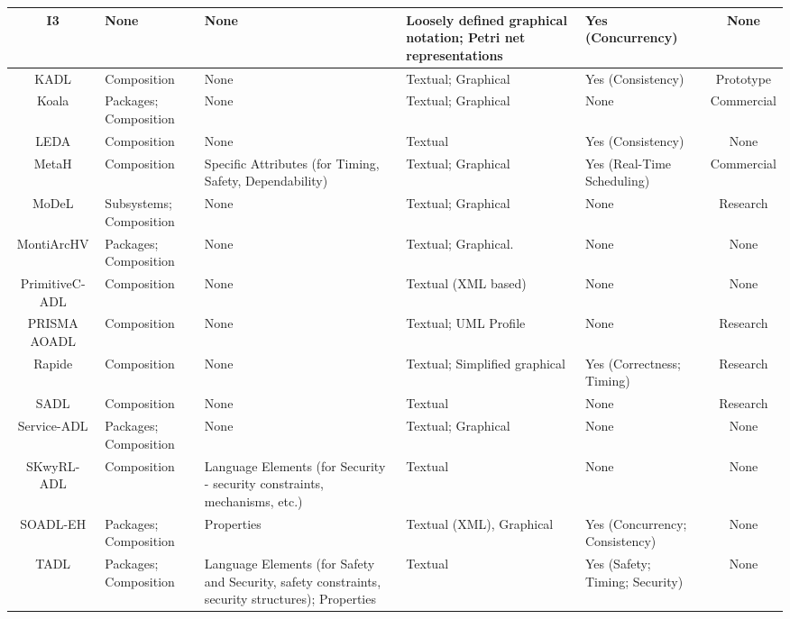 \begin{landscape}
\begin{longtable}{|c|P{2cm}|P{3cm}|P{3cm}|p{2cm}|c|}
I3 & None & None & Loosely defined graphical notation; Petri net representations & Yes (Concurrency) & None \\ 
\hline

KADL & Composition & None & Textual; Graphical & Yes (Consistency) & Prototype \\ 
\hline

Koala & Packages; Composition & None & Textual; Graphical & None & Commercial \\ 
\hline

LEDA & Composition & None & Textual & Yes (Consistency) & None \\ 
\hline

MetaH & Composition & Specific Attributes (for Timing, Safety, Dependability) & Textual; Graphical & Yes (Real-Time Scheduling) & Commercial \\ 
\hline

MoDeL & Subsystems; Composition & None & Textual; Graphical & None & Research \\ 
\hline

MontiArcHV & Packages; Composition & None & Textual; Graphical. & None & None \\ 
\hline

PrimitiveC-ADL & Composition & None & Textual (XML based) & None & None \\ 
\hline

PRISMA AOADL & Composition & None & Textual; UML Profile & None & Research \\ 
\hline

Rapide & Composition & None & Textual; Simplified graphical & Yes (Correctness; Timing) & Research \\ 
\hline

SADL & Composition & None & Textual & None & Research \\ 
\hline

Service-ADL & Packages; Composition & None & Textual; Graphical & None & None \\ 
\hline

SKwyRL-ADL & Composition & Language Elements (for Security - security constraints, mechanisms, etc.) & Textual & None & None \\ 
\hline

SOADL-EH & Packages; Composition & Properties & Textual (XML), Graphical & Yes (Concurrency; Consistency) & None \\ 
\hline

TADL & Packages; Composition & Language Elements (for Safety and Security, safety constraints, security structures); Properties & Textual & Yes (Safety; Timing; Security) & None \\ 
\hline


\end{longtable}
\end{landscape}
